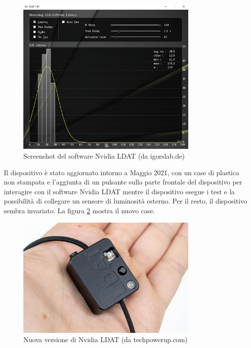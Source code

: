 \begin{figure}[h!]
	\centering
	\includegraphics[width=0.8\textwidth]{StatoDellArte_files/nvldat_software.png}
	\caption{Screenshot del software Nvidia LDAT (da igorslab.de)}
	\label{fig:nvldat_software}
\end{figure}

Il dispositivo è stato aggiornato intorno a Maggio 2021, con un case di plastica non stampata e l'aggiunta di un pulsante sulla parte frontale del dispositivo per interagire con il software Nvidia LDAT mentre il dispositivo esegue i test e la possibilità di collegare un sensore di luminosità esterno. Per il resto, il dispositivo sembra invariato. La figura \ref{fig:nvldat_v2} mostra il nuovo case.

\begin{figure}[h!]
	\centering
	\includegraphics[width=0.8\textwidth]{StatoDellArte_files/nvldat_v2.jpg}
	\caption{Nuova versione di Nvidia LDAT (da techpowerup.com)}
	\label{fig:nvldat_v2}
\end{figure}

